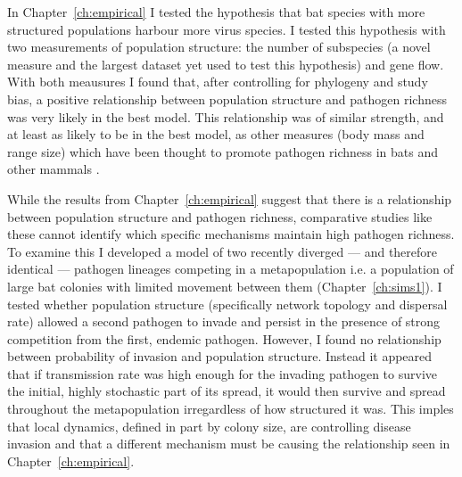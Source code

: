 


In Chapter~\ref{ch:empirical} I tested the hypothesis that bat species with more structured populations harbour more virus species.
I tested this hypothesis with two measurements of population structure: the number of subspecies (a novel measure and the largest dataset yet used to test this hypothesis) and gene flow.
With both meausures I found that, after controlling for phylogeny and study bias, a positive relationship between population structure and pathogen richness was very likely in the best model.
This relationship was of similar strength, and at least as likely to be in the best model, as other measures (body mass and range size) which have been thought to promote pathogen richness in bats and other mammals \cite{kamiya2014determines, arneberg2002host, gay2014parasite, nunn2003comparative, turmelle2009correlates}.




While the results from Chapter~\ref{ch:empirical} suggest that there is a relationship between population structure and pathogen richness, comparative studies like these cannot identify which specific mechanisms maintain high pathogen richness.
To examine this I developed a model of two recently diverged --- and therefore identical --- pathogen lineages competing in a metapopulation i.e. a population of large bat colonies with limited movement between them (Chapter~\ref{ch:sims1}). 
I tested whether population structure (specifically network topology and dispersal rate) allowed a second pathogen to invade and persist in the presence of strong competition from the first, endemic pathogen.
However, I found no relationship between probability of invasion and population structure.
Instead it appeared that if transmission rate was high enough for the invading pathogen to survive the initial, highly stochastic part of its spread, it would then survive and spread throughout the metapopulation irregardless of how structured it was.
This imples that local dynamics, defined in part by colony size, are controlling disease invasion and that a different mechanism must be causing the relationship seen in Chapter~\ref{ch:empirical}.



